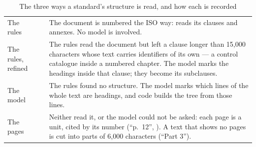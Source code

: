 \begin{table}[H]
\caption{The three ways a standard's structure is read, and how each is recorded}\label{tab:corpus:methods}
\begin{tabularx}{\textwidth}{@{}L{22mm}L{30mm}Y@{}}
\toprule
{} &  &  \\
\midrule
The rules &  & The document is numbered the ISO way:  reads its clauses and annexes. No model is involved. \\
The rules, refined &  & The rules read the document but left a clause longer than 15,000 characters whose text carries identifiers of its own --- a control catalogue inside a numbered chapter. The model marks the headings inside that clause; they become its subclauses. \\
The model &  & The rules found no structure. The model marks which lines of the whole text are headings, and code builds the tree from those lines. \\
The pages &  & Neither read it, or the model could not be asked: each page is a unit, cited by its number (\enquote{p.~12}, ). A text that shows no pages is cut into parts of 6,000 characters (\enquote{Part 3}). \\
\bottomrule
\end{tabularx}
\end{table}

